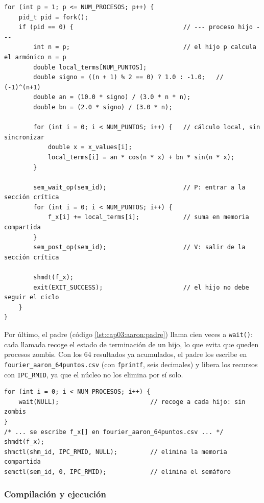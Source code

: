 \begin{lstlisting}[style=C, caption={Creación de los 100 hijos: cálculo local del armónico y acumulación protegida por el semáforo.}, label={lst:cap03:aaron:hijo}]
for (int p = 1; p <= NUM_PROCESOS; p++) {
    pid_t pid = fork();
    if (pid == 0) {                              // --- proceso hijo ---
        int n = p;                               // el hijo p calcula el armónico n = p
        double local_terms[NUM_PUNTOS];
        double signo = ((n + 1) % 2 == 0) ? 1.0 : -1.0;   // (-1)^(n+1)
        double an = (10.0 * signo) / (3.0 * n * n);
        double bn = (2.0 * signo) / (3.0 * n);

        for (int i = 0; i < NUM_PUNTOS; i++) {   // cálculo local, sin sincronizar
            double x = x_values[i];
            local_terms[i] = an * cos(n * x) + bn * sin(n * x);
        }

        sem_wait_op(sem_id);                     // P: entrar a la sección crítica
        for (int i = 0; i < NUM_PUNTOS; i++) {
            f_x[i] += local_terms[i];            // suma en memoria compartida
        }
        sem_post_op(sem_id);                     // V: salir de la sección crítica

        shmdt(f_x);
        exit(EXIT_SUCCESS);                      // el hijo no debe seguir el ciclo
    }
}
\end{lstlisting}

Por último, el padre (código \ref{lst:cap03:aaron:padre}) llama cien veces a \texttt{wait()}: cada llamada recoge el estado de terminación de un hijo, lo que evita que queden procesos zombis. Con los 64 resultados ya acumulados, el padre los escribe en \texttt{fourier\_aaron\_64puntos.csv} (con \texttt{fprintf}, seis decimales) y libera los recursos con \texttt{IPC\_RMID}, ya que el núcleo no los elimina por sí solo.

\begin{lstlisting}[style=C, caption={El padre espera a los hijos y libera los recursos IPC.}, label={lst:cap03:aaron:padre}]
for (int i = 0; i < NUM_PROCESOS; i++) {
    wait(NULL);                         // recoge a cada hijo: sin zombis
}
/* ... se escribe f_x[] en fourier_aaron_64puntos.csv ... */
shmdt(f_x);
shmctl(shm_id, IPC_RMID, NULL);         // elimina la memoria compartida
semctl(sem_id, 0, IPC_RMID);            // elimina el semáforo
\end{lstlisting}

\subsubsection{Compilación y ejecución}
\label{sec:cap03:aaron:ejecucion}

